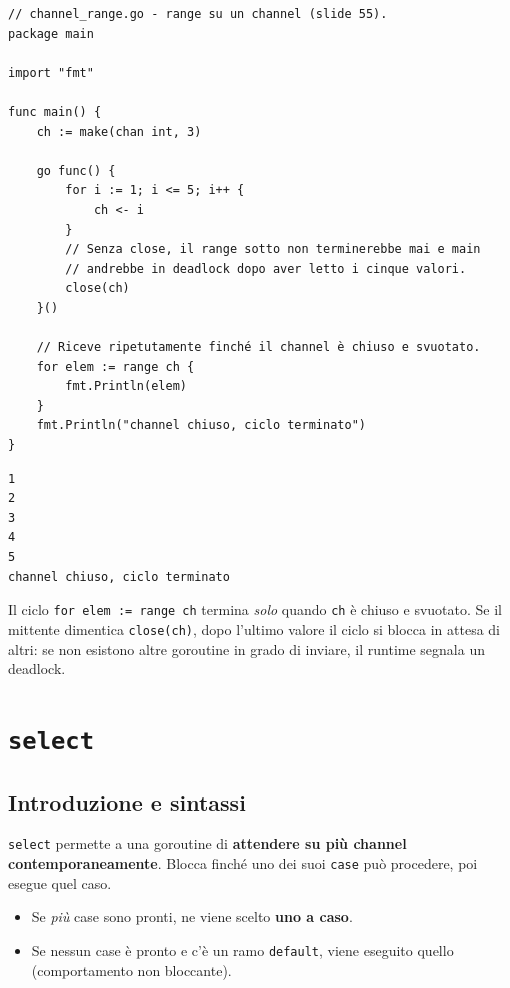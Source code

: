 \documentclass[11pt,a4paper]{report}
\newcommand{\cod}[1]{\texttt{#1}}
\begin{document}
\begin{lstlisting}[style=gocode,caption={\texttt{06\_concurrency/channel\_range.go}}]
// channel_range.go - range su un channel (slide 55).
package main

import "fmt"

func main() {
	ch := make(chan int, 3)

	go func() {
		for i := 1; i <= 5; i++ {
			ch <- i
		}
		// Senza close, il range sotto non terminerebbe mai e main
		// andrebbe in deadlock dopo aver letto i cinque valori.
		close(ch)
	}()

	// Riceve ripetutamente finché il channel è chiuso e svuotato.
	for elem := range ch {
		fmt.Println(elem)
	}
	fmt.Println("channel chiuso, ciclo terminato")
}
\end{lstlisting}
\begin{lstlisting}[style=output]
1
2
3
4
5
channel chiuso, ciclo terminato
\end{lstlisting}

\begin{attenzione}
Il ciclo \cod{for elem := range ch} termina \emph{solo} quando \cod{ch} è chiuso
e svuotato. Se il mittente dimentica \cod{close(ch)}, dopo l'ultimo valore il
ciclo si blocca in attesa di altri: se non esistono altre goroutine in grado di
inviare, il runtime segnala un deadlock.
\end{attenzione}

\section{\texttt{select}}\label{sec:select}

\subsection{Introduzione e sintassi}

\cod{select} permette a una goroutine di \textbf{attendere su più channel
contemporaneamente}. Blocca finché uno dei suoi \cod{case} può procedere, poi
esegue quel caso.

\begin{itemize}
  \item Se \emph{più} case sono pronti, ne viene scelto \textbf{uno a caso}.
  \item Se nessun case è pronto e c'è un ramo \cod{default}, viene eseguito
        quello (comportamento non bloccante).
\end{itemize}
\end{document}

